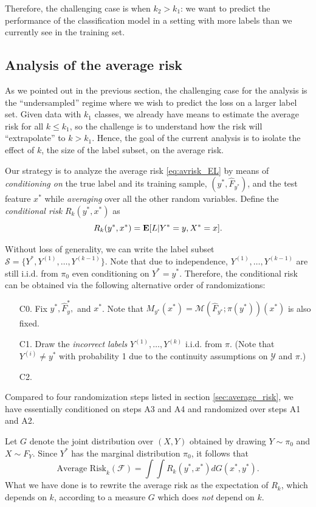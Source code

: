 \documentclass[12pt]{article}
\begin{document}
Therefore, the challenging case is when $k_2 > k_1$: we want to
predict the performance of the classification model in a setting with
more labels than we currently see in the training set.

\subsection{Analysis of the average risk}

As we pointed out in the previous section, the challenging case for
the analysis is the ``undersampled'' regime where we wish to predict
the loss on a larger label set.  Given data with $k_1$ classes, we
already have means to estimate the average risk for all $k \leq k_1$,
so the challenge is to understand how the risk will ``extrapolate'' to
$k > k_1$.  Hence, the goal of the current analysis is to isolate the
effect of $k$, the size of the label subset, on the average risk.

Our strategy is to analyze the average risk \eqref{eq:avrisk_EL} by
means of \emph{conditioning on} the true label and its training
sample, $(y^*, \hat{F}_{y^*})$, and the test feature $x^*$
while \emph{averaging} over all the other random variables.  Define
the \emph{conditional risk} $R_k(y^*, x^*)$ as
\[
R_k(y^*, x^*) = \textbf{E}[L|Y^*=y, X^* = x].
\]

Without loss of generality, we can write the label subset $\mathcal{S}
= \{Y^*, Y^{(1)},\hdots, Y^{(k-1)}\}$.  Note that due to independence,
$Y^{(1)},\hdots, Y^{(k-1)}$ are still i.i.d. from $\pi_0$ even
conditioning on $Y^* = y^*.$ Therefore, the conditional risk can be
obtained via the following alternative order of randomizations:
\begin{enumerate}
\item[C0.] 
Fix $y^*, \hat{F}_y^*,$ and $x^*$.  Note that $M_{y^*}(x^*)
= \mathcal{M}(\hat{F}_{y^*}; \pi(y^*))(x^*)$ is also fixed.
\item[C1.]
Draw the \emph{incorrect labels} $Y^{(1)},\hdots, Y^{(k)}$ i.i.d. from
$\pi$.  (Note that $Y^{(i)} \neq y^*$ with probability 1 due to the
continuity assumptions on $\mathcal{Y}$ and $\pi$.)
\item[C2.]

\end{enumerate}

Compared to four randomization steps listed in
section \ref{sec:average_risk}, we have essentially conditioned on
steps A3 and A4 and randomized over steps A1 and A2.


Let $G$ denote the joint distribution over $(X, Y)$ obtained by
drawing $Y \sim \pi_0$ and $X \sim F_Y$.  Since $Y^*$ has the marginal
distribution $\pi_0$, it follows that
\begin{equation}\label{eq:rk_eq}
\text{Average Risk}_k(\mathcal{F}) = \int \int R_k(y^*, x^*) dG(x^*, y^*).
\end{equation}
What we have done is to rewrite the average risk as the expectation of
$R_k$, which depends on $k$, according to a measure $G$ which does
\emph{not} depend on $k$.
\end{document}
